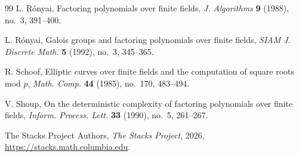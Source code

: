 \begin{thebibliography}{99}
L. R\'onyai, Factoring polynomials over finite fields,
\emph{J. Algorithms} \textbf{9} (1988), no.~3, 391--400.

L. R\'onyai, Galois groups and factoring polynomials over finite fields,
\emph{SIAM J. Discrete Math.} \textbf{5} (1992), no.~3, 345--365.

R. Schoof, Elliptic curves over finite fields and the computation of square
roots mod $p$, \emph{Math. Comp.} \textbf{44} (1985), no.~170, 483--494.

V. Shoup, On the deterministic complexity of factoring polynomials over
finite fields, \emph{Inform. Process. Lett.} \textbf{33} (1990), no.~5,
261--267.

The Stacks Project Authors, \emph{The Stacks Project}, 2026,
\url{https://stacks.math.columbia.edu}.

\end{thebibliography}
